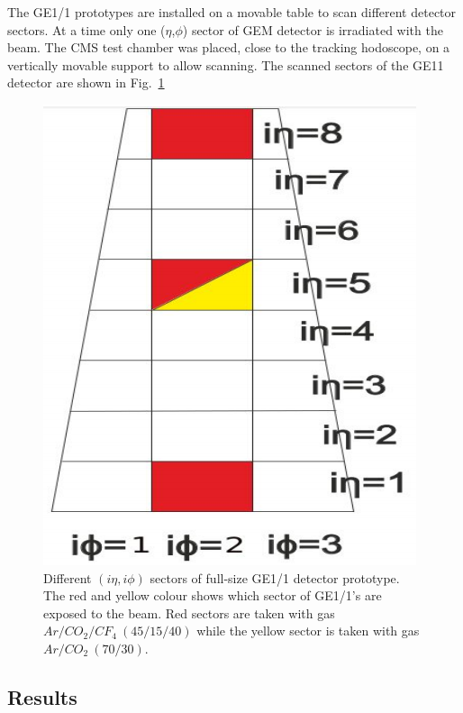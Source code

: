 The GE1/1 prototypes are installed on a movable table to scan different detector sectors. At a time only one ($\eta$,$\phi$) sector of GEM detector is irradiated with the beam.
The CMS test chamber was placed, close to the tracking hodoscope, on a vertically movable support to allow scanning.  The scanned sectors of the GE11 detector are shown in Fig.~\ref{GE11}
\begin{figure}[!htbp]
\centering
\includegraphics[scale=0.5,angle=90]{figures/GEM/GE11.png}
\caption{Different $(i\eta,i\phi)$ sectors of full-size GE1/1 detector prototype. The red and yellow colour shows which sector of GE1/1's are exposed to the beam. Red sectors are taken with gas $Ar/CO_2/CF_4~(45/15/40)$ while the yellow sector is taken with gas $Ar/CO_2~(70/30)$.}
\label{GE11}
\end{figure}
\subsection{Results} %
\label{sub:results}

